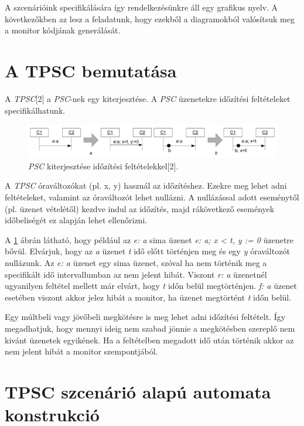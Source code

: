 A szcenárióink specifikálására így rendelkezésünkre áll egy grafikus nyelv.
A következőkben az lesz a feladatunk, hogy ezekből a diagramokból valósítsuk meg a monitor kódjának generálását.

\section{A TPSC bemutatása}
A \textit{TPSC}[2] a \textit{PSC}-nek egy kiterjesztése.
A \textit{PSC} üzenetekre időzítési feltételeket specifikálhatunk.

\begin{figure}[!ht]
    \centering
    \includegraphics[width=150mm, keepaspectratio]{figures/4abra.png}
    \caption{\textit{PSC} kiterjesztése időzítési feltételekkel[2].}
    \label{psc_clock_improvement}
\end{figure}

A \textit{TPSC} óraváltozókat (pl. x, y) használ az időzítéshez.
Ezekre meg lehet adni feltételeket, valamint az óraváltozót lehet nullázni.
A nullázással adott eseménytől (pl. üzenet vételétől) kezdve indul az időzítés, majd rákövetkező események időbeliségét ez alapján lehet ellenőrizni.

A \ref{psc_clock_improvement} ábrán látható, hogy például az \textit{e: a} sima üzenet \textit{e: a; x < t, y := 0} üzenetre bővül.
Elvárjuk, hogy az \textit{a} üzenet \textit{t} idő előtt történjen meg és egy \textit{y} óraváltozót nullázunk.
Az \textit{e: a} üzenet egy sima üzenet, szóval ha nem történik meg a specifikált idő intervallumban az nem jelent hibát.
Viszont \textit{r: a} üzenetnél ugyanilyen feltétel mellett már elvárt, hogy \textit{t} időn belül megtörténjen. \textit{f: a} üzenet esetében viszont akkor jelez hibát a monitor, ha üzenet megtörtént \textit{t} időn belül.

Egy múltbeli vagy jövőbeli megkötésre is meg lehet adni időzítési feltételt.
Így megadhatjuk, hogy mennyi ideig nem szabad jönnie a megkötésben szereplő nem kivánt üzenetek egyikének.
Ha a feltételben megadott idő után történik akkor az nem jelent hibát a monitor szempontjából.

\clearpage\section{TPSC szcenárió alapú automata konstrukció}

